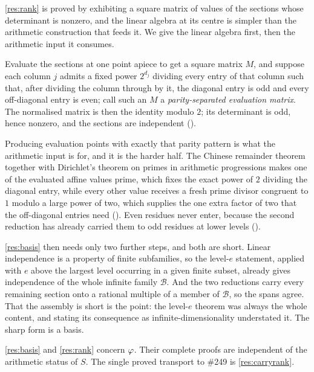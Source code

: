 \documentclass[11pt]{article}
\newcommand{\Stot}{S}
\begin{document}
\ref{res:rank} is proved by exhibiting a square matrix of values of the
sections whose determinant is nonzero, and the linear algebra at its centre is
simpler than the arithmetic construction that feeds it.  We give the linear
algebra first, then the arithmetic input it consumes.

Evaluate the sections at one point apiece to get a square matrix $M$, and
suppose each column $j$ admits a fixed power $2^{d_j}$ dividing every entry of
that column such that, after dividing the column through by it, the diagonal
entry is odd and every off-diagonal entry is even; call such an $M$ a
\emph{parity-separated evaluation matrix}.  The normalised matrix is then the
identity modulo $2$; its determinant is odd, hence nonzero, and the sections are
independent
().

Producing evaluation points with exactly that parity pattern is what the
arithmetic input is for, and it is the harder half.  The Chinese remainder
theorem together with Dirichlet's theorem on primes in arithmetic progressions
makes one of the evaluated affine values prime, which fixes the exact power of
$2$ dividing the diagonal entry, while every other value receives a fresh
prime divisor congruent to $1$ modulo a large power of two, which supplies the
one extra factor of two that the off-diagonal entries need
().
Even residues never enter, because the second reduction has already carried
them to odd residues at lower levels
().

\ref{res:basis} then needs only two further steps, and both are short.  Linear
independence is a property of finite subfamilies, so the level-$e$ statement,
applied with $e$ above the largest level occurring in a given finite subset,
already gives independence of the whole infinite family $\mathcal B$.  And
the two reductions carry every remaining section onto a rational multiple of a
member of $\mathcal B$, so the spans agree.  That the assembly is short is the
point: the level-$e$ theorem was always the whole content, and stating its
consequence as infinite-dimensionality understated it.  The sharp form is a
basis.

\begin{remark}
\ref{res:basis} and \ref{res:rank} concern $\varphi$.  Their complete proofs are
independent of the arithmetic status of $\Stot$.  The single proved transport
to \#249 is \ref{res:carryrank}.
\end{remark}
\end{document}
